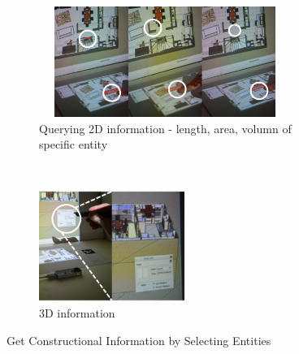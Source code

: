 \begin{figure}[h!]
	\centering
        \begin{subfigure}[b]{1.0\columnwidth}
	        \centering
                \includegraphics[width=0.9\textwidth, height=3.6cm]{4-Interaction_Design/2d_info}
                \caption{Querying 2D information - length, area, volumn of specific entity}
                \label{fig:2d_info}
        \end{subfigure}%
        \\
        \begin{subfigure}[b]{1.0\columnwidth}
            \centering
            \includegraphics[width=0.7\columnwidth, height=3.6cm]{4-Interaction_Design/3d_info_1}
                \caption{3D information}
                \label{fig:3d_info}
        \end{subfigure}
	\caption{Get Constructional Information by Selecting Entities}
    \label{fig:infor}
\end{figure}





